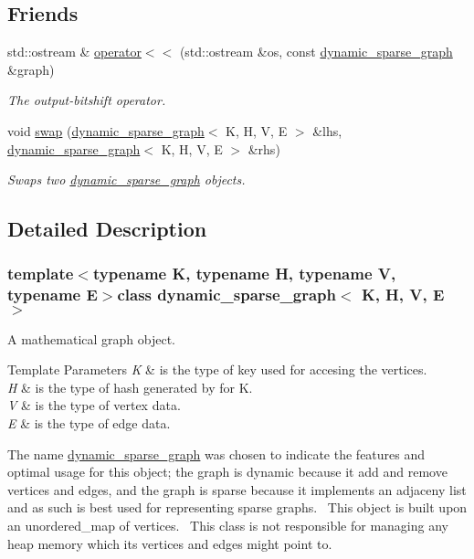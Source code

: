 \subsection*{Friends}
\begin{DoxyCompactItemize}
\item 
std\+::ostream \& \hyperlink{classdynamic__sparse__graph_a674ca4493524c0cfb23ded95a9e0b554}{operator$<$$<$} (std\+::ostream \&os, const \hyperlink{classdynamic__sparse__graph}{dynamic\+\_\+sparse\+\_\+graph} \&graph)
\begin{DoxyCompactList}\small\item\em The output-\/bitshift operator. \end{DoxyCompactList}\item 
void \hyperlink{classdynamic__sparse__graph_adc8b9cef2cfb6649bf4d19e57b222388}{swap} (\hyperlink{classdynamic__sparse__graph}{dynamic\+\_\+sparse\+\_\+graph}$<$ K, H, V, E $>$ \&lhs, \hyperlink{classdynamic__sparse__graph}{dynamic\+\_\+sparse\+\_\+graph}$<$ K, H, V, E $>$ \&rhs)
\begin{DoxyCompactList}\small\item\em Swaps two \hyperlink{classdynamic__sparse__graph}{dynamic\+\_\+sparse\+\_\+graph} objects. \end{DoxyCompactList}\end{DoxyCompactItemize}


\subsection{Detailed Description}
\subsubsection*{template$<$typename K, typename H, typename V, typename E$>$class dynamic\+\_\+sparse\+\_\+graph$<$ K, H, V, E $>$}

A mathematical graph object. 


\begin{DoxyTemplParams}{Template Parameters}
{\em K} & is the type of key used for accesing the vertices. \\
\hline
{\em H} & is the type of hash generated by for K. \\
\hline
{\em V} & is the type of vertex data. \\
\hline
{\em E} & is the type of edge data.\\
\hline
\end{DoxyTemplParams}
The name \hyperlink{classdynamic__sparse__graph}{dynamic\+\_\+sparse\+\_\+graph} was chosen to indicate the features and optimal usage for this object; the graph is dynamic because it add and remove vertices and edges, and the graph is sparse because it implements an adjaceny list and as such is best used for representing sparse graphs.~\newline
This object is built upon an unordered\+\_\+map of vertices.~\newline
This class is not responsible for managing any heap memory which its vertices and edges might point to. 

